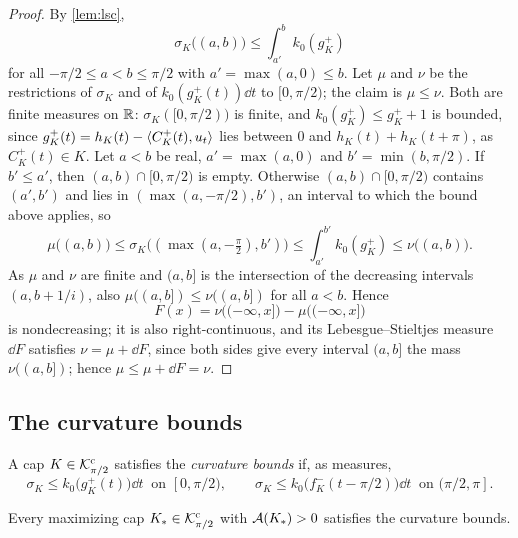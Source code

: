 \begin{proof}
By \cref{lem:lsc},
\[
  \sigma_K\bigl((a,b)\bigr)\le\int_{a'}^bk_0(g_K^+)
\]
for all $-\pi/2\le a<b\le\pi/2$ with $a'=\max(a,0)\le b$. Let $\mu$ and $\nu$
be the restrictions of $\sigma_K$ and of $k_0(g_K^+(t))\dd t$ to $[0,\pi/2)$;
the claim is $\mu\le\nu$. Both are finite measures on $\mathbb{R}$:
$\sigma_K([0,\pi/2))$ is finite, and $k_0(g_K^+)\le g_K^++1$ is bounded, since
$g_K^+(t)=h_K(t)-\langle C_K^+(t),u_t\rangle$ lies between $0$ and $h_K(t)+h_K(t+\pi)$,
as $C_K^+(t)\in K$. Let $a<b$ be real, $a'=\max(a,0)$ and $b'=\min(b,\pi/2)$. If
$b'\le a'$, then $(a,b)\cap[0,\pi/2)$ is empty. Otherwise $(a,b)\cap[0,\pi/2)$
contains $(a',b')$ and lies in $(\max(a,-\pi/2),b')$, an interval to which the
bound above applies, so
\[
  \mu\bigl((a,b)\bigr)\le\sigma_K\bigl((\max(a,-\tfrac\pi2),b')\bigr)
    \le\int_{a'}^{b'}k_0(g_K^+)\le\nu\bigl((a,b)\bigr).
\]
As $\mu$ and $\nu$ are finite and $(a,b]$ is the intersection of the decreasing
intervals $(a,b+1/i)$, also $\mu((a,b])\le\nu((a,b])$ for all $a<b$. Hence
\[
  F(x)=\nu\bigl((-\infty,x]\bigr)-\mu\bigl((-\infty,x]\bigr)
\]
is nondecreasing; it is also right-continuous, and its Lebesgue--Stieltjes
measure $\dd F$ satisfies $\nu=\mu+\dd F$, since both sides give every interval
$(a,b]$ the mass $\nu((a,b])$; hence $\mu\le\mu+\dd F=\nu$.
\end{proof}

\subsection{The curvature bounds}

\begin{definition}\label{def:curvature}
A cap $K\in\mathcal{K}^{\mathrm{c}}_{\pi/2}$ satisfies the \emph{curvature bounds} if, as measures,
\[
  \sigma_K\le k_0\bigl(g_K^+(t)\bigr)\dd t\ \text{ on }[0,\pi/2),\qquad
  \sigma_K\le k_0\bigl(f_K^-(t-\pi/2)\bigr)\dd t\ \text{ on }(\pi/2,\pi].
\]
\end{definition}

\begin{proposition}\label{prop:curvature}
Every maximizing cap $K_*\in\mathcal{K}^{\mathrm{c}}_{\pi/2}$ with $\mathcal{A}(K_*)>0$ satisfies the
curvature bounds.
\end{proposition}

